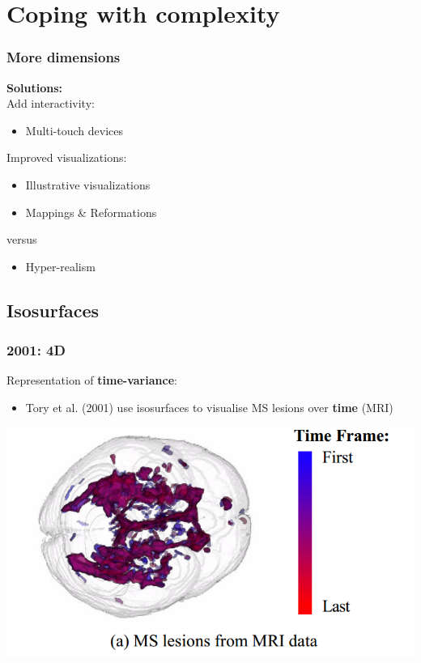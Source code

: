 \documentclass{beamer}
\begin{document}
\section{Coping with complexity}
\begin{frame}
	\frametitle{More dimensions}
	\textbf{Solutions:}\\
	Add interactivity:
	\begin{itemize}
		\item Multi-touch devices
	\end{itemize}
	Improved visualizations:\\
	\begin{itemize}
		\item Illustrative visualizations
		\item Mappings \& Reformations
	\end{itemize}
	versus
	\begin{itemize}
		\item Hyper-realism
	\end{itemize}
\end{frame}

\subsection{Isosurfaces}
\begin{frame}
	\frametitle{2001: 4D}
	Representation of \textbf{time-variance}:
	\begin{itemize}
		\item Tory et al. (2001) use isosurfaces to visualise MS lesions over
			\textbf{time} (MRI)
	\end{itemize}
	\begin{center}
		\includegraphics[width=.8\textwidth]{images/ms_time}
	\end{center}
\end{frame}
\end{document}
